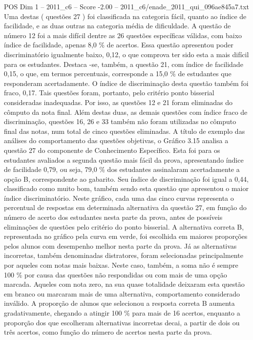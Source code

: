\begin{textsample}{POS Dim 1 – 2011\_c6 – Score -2.00 – 2011\_c6/enade\_2011\_qui\_096ae845a7.txt}
Uma destas ( questões 27 ) foi classificada na categoria fácil, quanto ao índice de facilidade, e as duas outras na categoria média de dificuldade.
A questão de número 12 foi a mais difícil dentre as 26 questões específicas válidas, com baixo índice de facilidade, apenas 8,0 \% de acertos.
Essa questão apresentou poder discriminatório igualmente baixo, 0,12, o que comprova ter sido esta a mais difícil para os estudantes.
Destaca -se, também, a questão 21, com índice de facilidade 0,15, o que, em termos percentuais, corresponde a 15,0 \% de estudantes que responderam acertadamente.
O índice de discriminação desta questão também foi fraco, 0,17.
Tais questões foram, portanto, pelo critério ponto bisserial consideradas inadequadas.
Por isso, as questões 12 e 21 foram eliminadas do cômputo da nota final.
Além destas duas, as demais questões com índice fraco de discriminação, questões 16, 26 e 33 também não foram utilizadas no cômputo final das notas, num total de cinco questões eliminadas.
A título de exemplo das análises do comportamento das questões objetivas, o Gráfico 3.15 analisa a questão 27 do componente de Conhecimento Específico.
Esta foi para os estudantes avaliados a segunda questão mais fácil da prova, apresentando índice de facilidade 0,79, ou seja, 79,0 \% dos estudantes assinalaram acertadamente a opção B, correspondente ao gabarito.
Seu índice de discriminação foi igual a 0,44, classificado como muito bom, também sendo esta questão que apresentou o maior índice discriminatório.
Neste gráfico, cada uma das cinco curvas representa o percentual de respostas em determinada alternativa da questão 27, em função do número de acerto dos estudantes nesta parte da prova, antes de possíveis eliminações de questões pelo critério do ponto bisserial.
A alternativa correta B, representada no gráfico pela curva em verde, foi escolhida em maiores proporções pelos alunos com desempenho melhor nesta parte da prova.
Já as alternativas incorretas, também denominadas distratores, foram selecionadas principalmente por aqueles com notas mais baixas.
Neste caso, também, a soma não é sempre 100 \% por causa das questões não respondidas ou com mais de uma opção marcada.
Aqueles com nota zero, na sua quase totalidade deixaram esta questão em branco ou marcaram mais de uma alternativa, comportamento considerado inválido.
A proporção de alunos que selecionou a resposta correta B aumenta gradativamente, chegando a atingir 100 \% para mais de 16 acertos, enquanto a proporção dos que escolheram alternativas incorretas decai, a partir de dois ou três acertos, como função do número de acertos nesta parte da prova.

\end{textsample}
